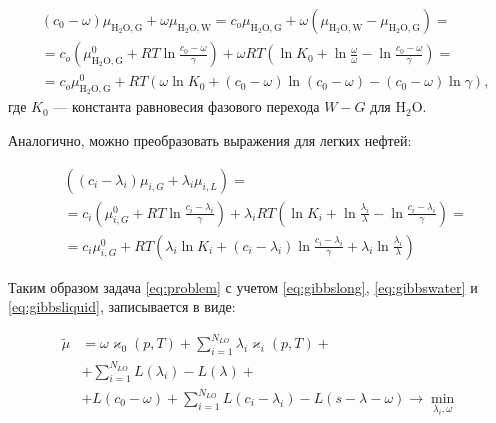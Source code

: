 \documentclass[12pt]{article}
\begin{document}
\begin{equation}
\begin{aligned}
& (c_0 - \omega) \mu_{\mathrm{H_2O, G}} + \omega \mu_{\mathrm{H_2O, W}} = c_o \mu_{\mathrm{H_2O, G}} + \omega (\mu_{\mathrm{H_2O, W}} - \mu_{\mathrm{H_2O, G}}) = \\
& = c_o \left(\mu_{\mathrm{H_2O, G}}^{0} + RT \ln \frac{c_0 - \omega}{\gamma}\right) + \omega RT \left(\ln K_0 + \ln \frac{\omega}{\omega} - \ln \frac{c_0 - \omega}{\gamma}\right) = \\
& = c_o \mu_{\mathrm{H_2O, G}}^{0} + RT \left(\omega \ln K_0 + (c_0 - \omega) \ln (c_0 - \omega) - (c_0 - \omega) \ln \gamma\right),
\end{aligned}
\label{eq:gibbswater}
\end{equation}
где $K_0$ --- константа равновесия фазового перехода $W-G$ для $\mathrm{H_2O}$.

Аналогично, можно преобразовать выражения для легких нефтей:

\begin{equation}
\begin{aligned}
& \left((c_i - \lambda_i) \mu_{i, G} + \lambda_i \mu_{i, L}\right) = \\
& = c_i \left(\mu_{i, G}^0 + RT \ln \frac{c_i - \lambda_i}{\gamma} \right) + \lambda_i RT \left(\ln K_i + \ln \frac{\lambda_i}{\lambda} - \ln \frac{c_i - \lambda_i}{\gamma}\right) = \\
& = c_i \mu_{i, G}^0 + RT \left(\lambda_i \ln K_i + (c_i - \lambda_i)\ln \frac{c_i - \lambda_i}{\gamma} + \lambda_i \ln \frac{\lambda_i}{\lambda} \right)
\end{aligned}
\label{eq:gibbsliquid}
\end{equation}

Таким образом задача \eqref{eq:problem} с учетом \eqref{eq:gibbslong}, \eqref{eq:gibbswater} и \eqref{eq:gibbsliquid}, записывается в виде:

\begin{equation}
\begin{aligned}
\tilde{\mu} &= \omega \varkappa_0(p,T) + \sum_{i=1}^{N_{LO}} \lambda_i \varkappa_i(p,T) + \\
&+ \sum_{i=1}^{N_{LO}} L(\lambda_i) - L(\lambda) + \\
&+ L(c_0 - \omega) + \sum_{i=1}^{N_{LO}} L(c_i - \lambda_i) - L(s - \lambda - \omega) \rightarrow \min_{\lambda_i, \omega}
\end{aligned}
\end{equation}
\end{document}
